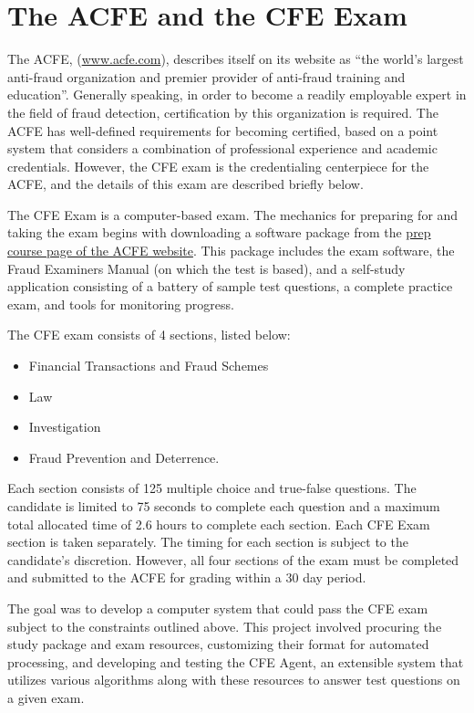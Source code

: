 \section{The ACFE and the CFE Exam}
\label{sect:acfe_and_cfe_exam}


The ACFE, (\url{www.acfe.com}), describes itself on its website as ``the world's largest anti-fraud organization and premier provider of anti-fraud training and education''.  Generally speaking, in order to become a readily employable expert in the field of fraud detection, certification by this organization is required.  The ACFE has well-defined requirements for becoming certified, based on a point system that considers a combination of professional experience and academic credentials.  However, the CFE exam is the credentialing centerpiece for the ACFE, and the details of this exam are described briefly below.

The CFE Exam is a computer-based exam.  The mechanics for preparing for and taking the exam begins with downloading a software package from the \href{http://www.acfe.com/CFE-Exam-Prep-Course-List.aspx}{prep course page of the ACFE website}.  This package includes the exam software, the Fraud Examiners Manual (on which the test is based), and a self-study application consisting of a battery of sample test questions, a complete practice exam, and tools for monitoring progress.  

The CFE exam consists of 4 sections, listed below:

\begin{itemize}
\item Financial Transactions and Fraud Schemes 
\item Law 
\item Investigation
\item Fraud Prevention and Deterrence.  
\end{itemize}

Each section consists of 125 multiple choice and true-false questions.  The candidate is limited to 75 seconds to complete each question and a maximum total allocated time of 2.6 hours to complete each section.  Each CFE Exam section is taken separately.  The timing for each section is subject to the candidate’s discretion.  However, all four sections of the exam must be completed and submitted to the ACFE for grading within a 30 day period.

The goal was to develop a computer system that could pass the CFE exam subject to the constraints outlined above.  This project involved procuring the study package and exam resources, customizing their format for automated processing, and developing and testing the CFE Agent, an extensible system that utilizes various algorithms along with these resources to answer test questions on a given exam.
